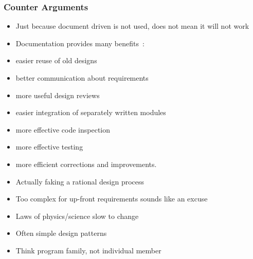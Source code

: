 \documentclass[t,12pt,numbers,fleqn]{beamer}
\begin{document}

\begin{frame}
\frametitle{Counter Arguments}

\begin {itemize}

\item Just because document driven is not used, does not mean it will not work
\item Documentation provides many
benefits~\cite{Parnas2010}: 
\bi
\item easier reuse of old designs
\item better communication about requirements
\item more useful design reviews
\item easier integration of separately
written modules
\item more effective code inspection
\item more effective testing
\item more efficient corrections and improvements.
\ei
\item Actually faking a rational design process
\item Too complex for up-front requirements sounds like an excuse
\bi
\item Laws of physics/science slow to change
\item Often simple design patterns
\item Think program family, not individual member
\ei
\end{itemize}

\end{frame}

\end{document}
